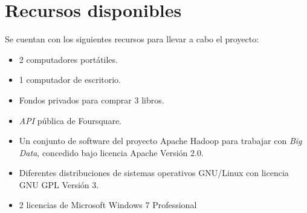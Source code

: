 \chapter{Recursos disponibles}
\label{sec:recursos}
Se cuentan con los siguientes recursos para llevar a cabo el proyecto:
\begin{itemize}
\item 2 computadores port\'atiles.
\item 1 computador de escritorio.
\item Fondos privados para comprar 3 libros.
\item \textit{API} p\'ublica de Foursquare.
\item Un conjunto de software del proyecto Apache Hadoop para trabajar con \textit{Big Data}, concedido bajo licencia Apache Versi\'on 2.0.
\item Diferentes distribuciones de sistemas operativos GNU/Linux con licencia GNU GPL Versi\'on 3.
\item 2 licencias de Microsoft Windows 7 Professional

\end{itemize}
\pagebreak
